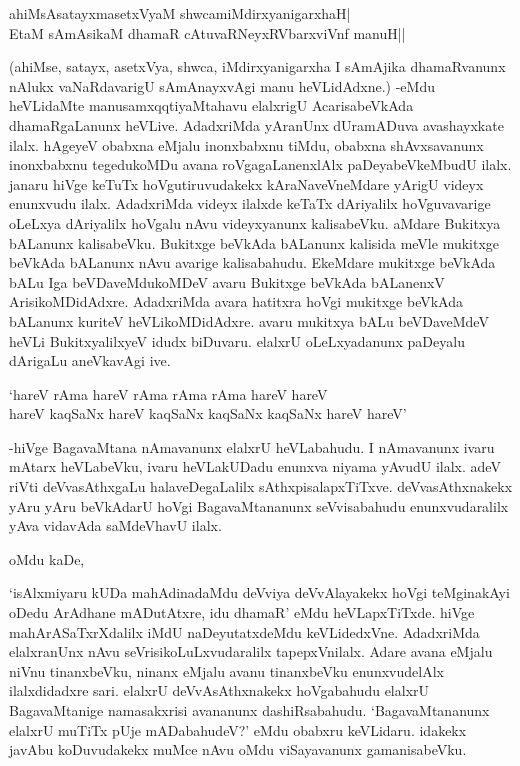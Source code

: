 \begin{shloka}
ahiMsAsatayxmasetxVyaM shwcamiMdirxyanigarxhaH|\\
EtaM sAmAsikaM dhamaR cAtuvaRNeyxRV\s barxviVnf manuH||
\end{shloka}

(ahiMse, satayx, asetxVya, shwca, iMdirxyanigarxha I sAmAjika dhamaRvanunx nAlukx vaNaRdavarigU sAmAnayxvAgi manu heVLidAdxne.) -eMdu heVLidaMte manusamxqqtiyaMtahavu elalxrigU AcarisabeVkAda dhamaRgaLanunx heVLive. AdadxriMda yAranUnx dUramADuva avashayxkate ilalx. hAgeyeV obabxna eMjalu inonxbabxnu tiMdu, obabxna shAvxsavanunx inonxbabxnu tegedukoMDu avana roVgagaLanenxlAlx paDeyabeVkeMbudU ilalx. janaru hiVge keTuTx hoVgutiruvudakekx kAraNaveVneMdare yArigU videyx enunxvudu ilalx. AdadxriMda videyx ilalxde keTaTx dAriyalilx hoVguvavarige oLeLxya dAriyalilx hoVgalu nAvu videyxyanunx kalisabeVku. aMdare Bukitxya bALanunx kalisabeVku. Bukitxge beVkAda bALanunx kalisida meVle mukitxge beVkAda bALanunx nAvu avarige kalisabahudu. EkeMdare mukitxge beVkAda bALu Iga beVDaveMdukoMDeV avaru Bukitxge beVkAda bALanenxV ArisikoMDidAdxre. AdadxriMda avara hatitxra hoVgi mukitxge beVkAda bALanunx kuriteV heVLikoMDidAdxre. avaru mukitxya bALu beVDaveMdeV heVLi BukitxyalilxyeV idudx biDuvaru. elalxrU oLeLxyadanunx paDeyalu dArigaLu aneVkavAgi ive.

\begin{shloka}
`hareV rAma hareV rAma rAma rAma hareV hareV\\
hareV kaqSaNx hareV kaqSaNx kaqSaNx kaqSaNx hareV hareV'
\end{shloka}

-hiVge BagavaMtana nAmavanunx elalxrU heVLabahudu. I nAmavanunx ivaru mAtarx heVLabeVku, ivaru heVLakUDadu enunxva niyama yAvudU ilalx. adeV riVti deVvasAthxgaLu halaveDegaLalilx sAthxpisalapxTiTxve. deVvasAthxnakekx yAru yAru beVkAdarU hoVgi BagavaMtananunx seVvisabahudu enunxvudaralilx yAva vidavAda saMdeVhavU ilalx.

oMdu kaDe,

`isAlxmiyaru kUDa mahAdinadaMdu deVviya deVvAlayakekx hoVgi teMginakAyi oDedu ArAdhane mADutAtxre, idu dhamaR' eMdu heVLapxTiTxde. hiVge mahArASaTxrXdalilx iMdU naDeyutatxdeMdu keVLidedxVne. AdadxriMda elalxranUnx nAvu seVrisikoLuLxvudaralilx tapepxVnilalx. Adare avana eMjalu niVnu tinanxbeVku, ninanx eMjalu avanu tinanxbeVku enunxvudelAlx ilalxdidadxre sari. elalxrU deVvAsAthxnakekx hoVgabahudu elalxrU BagavaMtanige namasakxrisi avananunx dashiRsabahudu. `BagavaMtananunx elalxrU muTiTx pUje mADabahudeV?' eMdu obabxru keVLidaru. idakekx 
javAbu koDuvudakekx muMce nAvu oMdu viSayavanunx gamanisabeVku.

